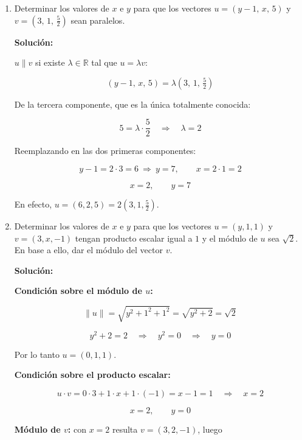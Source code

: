 \documentclass[12pt]{article}
\newcommand{\solucion}{%
    \vspace{0.8em}%
    \textbf{Solución:}%
    \vspace{0.8em}%
}
\begin{document}
\begin{enumerate}[label=\alph*.-]
    \[
    \boxed{x_1=2,\qquad x_2=-1}
    \]

    \textbf{Verificación:} para $x=2$ es $u=(4,1,3)$ y
    $u\cdot v=4-1-3=0$. \checkmark \\
    Para $x=-1$ es $u=(1,-2,3)$ y $u\cdot v=1+2-3=0$. \checkmark

    \item Determinar los valores de $x$ e $y$ para que los vectores
    $u=(y-1,\,x,\,5)$ y $v=\left(3,\,1,\,\tfrac{5}{2}\right)$ sean paralelos.

    \solucion

    $u\parallel v$ si existe $\lambda\in\mathbb{R}$ tal que $u=\lambda v$:

    \[
    (y-1,\,x,\,5)=\lambda\left(3,\,1,\,\tfrac{5}{2}\right)
    \]

    De la tercera componente, que es la única totalmente conocida:

    \[
    5=\lambda\cdot\frac{5}{2}\quad\Longrightarrow\quad \lambda=2
    \]

    Reemplazando en las dos primeras componentes:

    \[
    y-1=2\cdot3=6\ \Longrightarrow\ y=7,\qquad x=2\cdot1=2
    \]

    \[
    \boxed{x=2,\qquad y=7}
    \]

    En efecto, $u=(6,2,5)=2\left(3,1,\tfrac{5}{2}\right)$. \checkmark

    \item Determinar los valores de $x$ e $y$ para que los vectores
    $u=(y,1,1)$ y $v=(3,x,-1)$ tengan producto escalar igual a $1$ y el
    módulo de $u$ sea $\sqrt{2}$. En base a ello, dar el módulo del vector $v$.

    \solucion

    \textbf{Condición sobre el módulo de $u$:}

    \[
    \|u\|=\sqrt{y^2+1^2+1^2}=\sqrt{y^2+2}=\sqrt{2}
    \]

    \[
    y^2+2=2\quad\Longrightarrow\quad y^2=0\quad\Longrightarrow\quad y=0
    \]

    Por lo tanto $u=(0,1,1)$.

    \textbf{Condición sobre el producto escalar:}

    \[
    u\cdot v=0\cdot3+1\cdot x+1\cdot(-1)=x-1=1
    \quad\Longrightarrow\quad x=2
    \]

    \[
    \boxed{x=2,\qquad y=0}
    \]

    \textbf{Módulo de $v$:} con $x=2$ resulta $v=(3,2,-1)$, luego


\end{enumerate}
\end{document}

